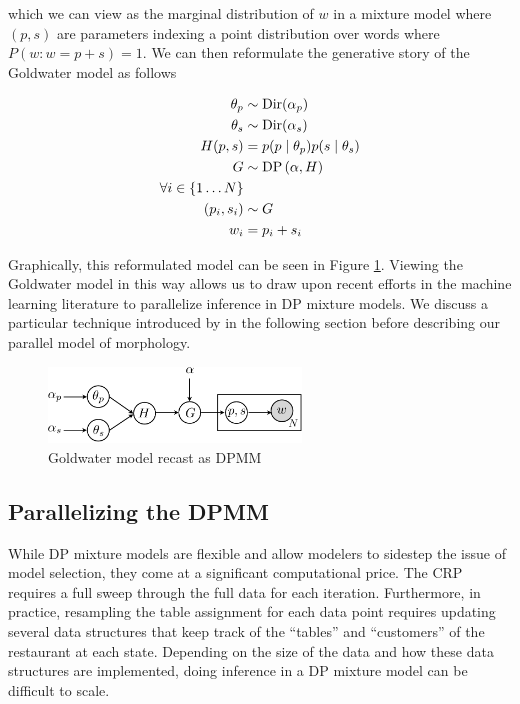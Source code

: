which we can view as the marginal distribution of $w$ in a mixture
model where $(p,s)$ are parameters indexing a point distribution over
words where $P(w : w = p+s) = 1$. We can then reformulate the
generative story of the Goldwater model as follows

\begin{align*}
  \theta_p & \sim \mathrm{Dir}(\alpha_p) \\
  \theta_s & \sim \mathrm{Dir}(\alpha_s) \\
  H(p, s) & = p(p \mid \theta_p) p(s \mid \theta_s) \\
  G & \sim \mathrm{DP}\left(\alpha, H\right)\\
  \forall i \in \{1 \dots N\} \\
  (p_i, s_i) & \sim G \\
  w_i & = p_i+s_i
\end{align*}

Graphically, this reformulated model can be seen in Figure
\ref{fig:v2}. Viewing the Goldwater model in this way allows us to
draw upon recent efforts in the machine learning literature to
parallelize inference in DP mixture models. We discuss a particular
technique introduced by \cite{williamson2013} in the following section
before describing our parallel model of morphology.

\begin{figure}[h]
\centering
\includegraphics[width=0.6\textwidth]{fig/v2}
\caption{Goldwater model recast as DPMM}
\label{fig:v2}
\end{figure}

\subsection{Parallelizing the DPMM}

While DP mixture models are flexible and allow modelers to sidestep
the issue of model selection, they come at a significant computational
price. The CRP requires a full sweep through the full data for each
iteration. Furthermore, in practice, resampling the table assignment
for each data point requires updating several data structures that
keep track of the ``tables'' and ``customers'' of the restaurant at
each state. Depending on the size of the data and how these data
structures are implemented, doing inference in a DP mixture model can
be difficult to scale.

